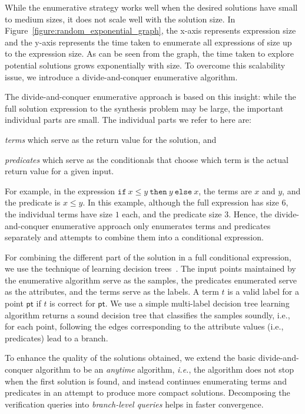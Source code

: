 \documentclass{llncs}
\newcommand\arsays[1]{{\bf AR: #1}}
\newcommand{\ie}{\emph{i.e.}}
\newcommand\Point{\mathsf{pt}}
\newcommand\Term{t}
\newcommand\ITE[3]{\mathtt{if}~#1~\mathtt{then}~#2~\mathtt{else}~#3}
\begin{document}
While the enumerative strategy works well when the desired solutions
have small to medium sizes, it does not scale well with the solution
size.  In Figure~\ref{figure:random_exponential_graph}, the x-axis
represents expression size and the y-axis represents the time taken to
enumerate all expressions of size up to the expression size.  As can
be seen from the graph, the time taken to explore potential solutions
grows exponentially with size.  To overcome this scalability issue, we
introduce a divide-and-conquer enumerative algorithm.

The divide-and-conquer enumerative approach is based on this insight:
while the full solution expression to the synthesis problem may be
large, the important individual parts are small.
The individual parts we refer to here are:
\begin{inparaenum}[(a)]
\item {\em terms} which serve as the return value for the solution,
  and
\item {\em predicates} which serve as the conditionals that choose which
  term is the actual return value for a given input.
\end{inparaenum}
For example, in the expression $\ITE{x \leq y}{y}{x}$, the terms are $x$
and $y$, and the predicate is $x \leq y$.
In this example, although the full expression has size $6$,
the individual terms have size $1$ each, and the predicate size $3$.
Hence, the divide-and-conquer enumerative approach only enumerates terms
and predicates separately and attempts to combine them into a
conditional expression.

For combining the different part of the solution in a full conditional
expression, we use the technique of learning decision
trees~\cite{quinlan-86,bishop-book}.
The input points maintained by the enumerative algorithm serve as the
samples, the predicates enumerated serve as the attributes, and the
terms serve as the labels.
A term $\Term$ is a valid label for a point $\Point$ if $\Term$ is
correct for $\Point$.
We use a simple multi-label decision tree learning algorithm returns a
sound decision tree that classifies the samples soundly, i.e., for each
point, following the edges corresponding to the attribute values (i.e.,
predicates) lead to a branch.

To enhance the quality of the solutions obtained, we extend the basic
divide-and-conquer algorithm to be an \emph{anytime}
algorithm, \ie, the algorithm does not stop when the first
solution is found, and instead continues enumerating terms and
predicates in an attempt to produce more compact
solutions. Decomposing the verification queries into
\emph{branch-level queries} helps in faster convergence.
\end{document}
